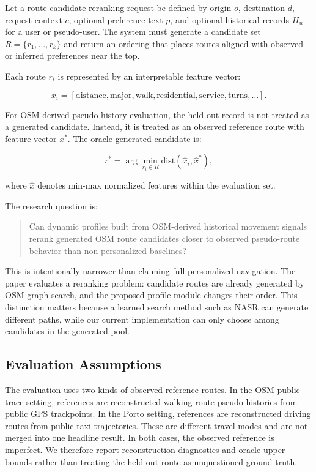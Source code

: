 Let a route-candidate reranking request be defined by origin $o$, destination $d$, request context $c$, optional preference text $p$, and optional historical records $H_u$ for a user or pseudo-user. The system must generate a candidate set $R = \{r_1,\ldots,r_k\}$ and return an ordering that places routes aligned with observed or inferred preferences near the top.

Each route $r_i$ is represented by an interpretable feature vector:

\begin{equation}
x_i = [\mathrm{distance}, \mathrm{major}, \mathrm{walk}, \mathrm{residential}, \mathrm{service}, \mathrm{turns}, \ldots].
\end{equation}

For OSM-derived pseudo-history evaluation, the held-out record is not treated as a generated candidate. Instead, it is treated as an observed reference route with feature vector $x^\ast$. The oracle generated candidate is:

\begin{equation}
r^\ast = \arg\min_{r_i \in R} \mathrm{dist}(\hat{x}_i, \hat{x}^\ast),
\end{equation}

where $\hat{x}$ denotes min-max normalized features within the evaluation set.

The research question is:

\begin{quote}
Can dynamic profiles built from OSM-derived historical movement signals rerank generated OSM route candidates closer to observed pseudo-route behavior than non-personalized baselines?
\end{quote}

This is intentionally narrower than claiming full personalized navigation. The paper evaluates a reranking problem: candidate routes are already generated by OSM graph search, and the proposed profile module changes their order. This distinction matters because a learned search method such as NASR can generate different paths, while our current implementation can only choose among candidates in the generated pool.

\subsection{Evaluation Assumptions}
The evaluation uses two kinds of observed reference routes. In the OSM public-trace setting, references are reconstructed walking-route pseudo-histories from public GPS trackpoints. In the Porto setting, references are reconstructed driving routes from public taxi trajectories. These are different travel modes and are not merged into one headline result. In both cases, the observed reference is imperfect. We therefore report reconstruction diagnostics and oracle upper bounds rather than treating the held-out route as unquestioned ground truth.

